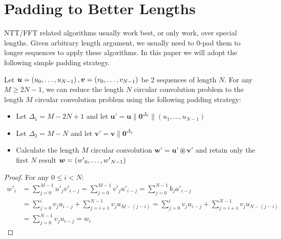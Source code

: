 \section{Padding to Better Lengths} \label{section:padding}
NTT/FFT related algorithms usually work best, or only work, over special lengths. Given arbitrary length argument, we usually need to 0-pad them to longer sequences to apply these algorithms. In this paper we will adopt the following simple padding strategy.

\begin{proposition}\label{prop:Padding}
    Let \(\bm{u} = \left({u}_0, \ldots, {u}_{N - 1}\right), \bm{v} = \left({v}_0, \ldots, {v}_{N - 1}\right)\) be 2 sequences of length \(N\). For any \(M \ge 2N - 1\), we can reduce the length \(N\) circular convolution problem to the length \(M\) circular convolution problem using the following padding strategy:
    \begin{itemize}
        \item Let \(\Delta_1 = M - 2N + 1\) and let \(\bm{u}' = \bm{u} \parallel \bm{0}^{\Delta_1} \parallel (u_1, \ldots, u_{N-1})\)
        \item Let \(\Delta_2 = M - N\) and let \(\bm{v}' = \bm{v} \parallel \bm{0}^{\Delta_2}\)
        \item Calculate the length \(M\) circular convolution \(\bm{w}' = \bm{u}' \circledast \bm{v}'\) and retain only the first \(N\) result \(\bm{w} = \left({w'}_0, \ldots, {w'}_{N - 1}\right)\)
    \end{itemize}
\end{proposition}
\begin{proof}
    For any \(0 \le i < N\):
    \begin{align*}
        w'_i &= \sum_{j=0}^{M-1}u'_j v'_{i-j} = \sum_{j=0}^{M-1} v'_j u'_{i-j} = \sum_{j=0}^{N-1} b_j a'_{i-j} \\
            &= \sum_{j=0}^{i}v_j u_{i-j} + \sum_{j=i+1}^{N-1}v_j u_{M - (j-i)} = \sum_{j=0}^{i} v_j u_{i-j} + \sum_{j=i+1}^{N-1} v_j u_{N - (j-i)} \\
            &= \sum_{j=0}^{N-1} v_j u_{i-j} = w_i
    \end{align*}
\end{proof}
\ifFullVersion

